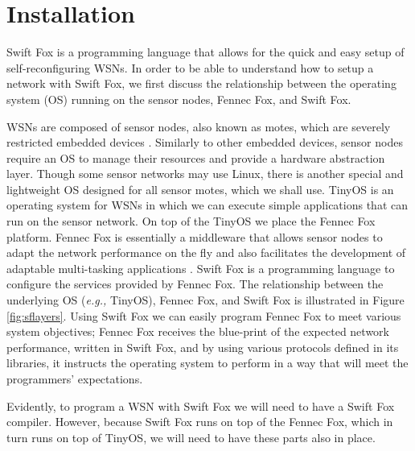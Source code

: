 \documentclass[11pt]{article}
\begin{document}
\section{Installation}
\label{sec:installation}

Swift Fox is a programming language that allows for the quick and easy
setup of self-reconfiguring WSNs. In order to be able to understand how to 
setup a network with Swift Fox, we first discuss the relationship between
the operating system (OS) running on the sensor nodes, Fennec Fox, and
Swift Fox.

WSNs are composed of sensor nodes, also known as motes, which are
severely restricted embedded devices \cite{culler:2004}. Similarly to other
embedded devices, sensor nodes require an OS to manage their resources and 
provide a hardware abstraction layer. Though some sensor networks may use
Linux, there is another special and lightweight OS designed for all sensor
motes, which we shall use. TinyOS is an operating system for WSNs in which 
we can execute simple applications that can run on the sensor network. On
top of the TinyOS we place the Fennec Fox platform. Fennec Fox is
essentially a middleware that allows sensor nodes to adapt the network
performance on the fly and also facilitates the development of adaptable
multi-tasking applications \cite{marcin:whitepaper}. Swift Fox is 
a programming language to configure the services provided by Fennec Fox.
The relationship between the underlying OS (\textit{e.g.,} TinyOS), Fennec 
Fox, and Swift Fox is illustrated in Figure \ref{fig:sflayers}. Using
Swift Fox we can easily program Fennec Fox to meet various system
objectives; Fennec Fox receives the blue-print of the expected network
performance, written in Swift Fox, and by using various protocols defined
in its libraries, it instructs the operating system to perform in a way
that will meet the programmers' expectations.

Evidently, to program a WSN with Swift Fox we will need to have a Swift
Fox compiler. However, because Swift Fox runs on top of the Fennec Fox,
which in turn runs on top of TinyOS, we will need to have these parts also
in place.
\end{document}
